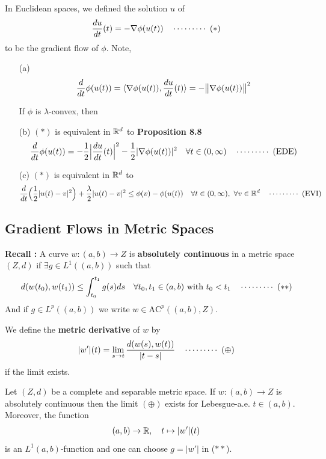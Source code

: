 \documentclass[12pt,a4paper]{article}
\begin{document}
In Euclidean spaces, we defined the solution $u$ of
\begin{align*}
\frac{du}{dt}(t) = -\nabla \phi(u(t)) \quad \cdots\cdots\cdots\,\,(*)
\end{align*}
to be the gradient flow of $\phi$. Note,
\begin{itemize}
\item[(a)]
\begin{align*}
\frac{d}{dt} \phi(u(t)) = \langle \nabla \phi(u(t)), \frac{du}{dt}(t) \rangle = -\bigl\lVert\nabla \phi(u(t))\bigr\rVert_{}^2
\end{align*}

If $\phi$ is $\lambda$-convex, then
\item[(b)] $(*)$ is equivalent in $\mathbb{R}^d$ to \textbf{Proposition 8.8}
\begin{align*}
\frac{d}{dt} \phi(u(t)) = -\frac{1}{2} \Big|\frac{du}{dt}(t)\Big|^2 - \frac{1}{2} |\nabla \phi(u(t))|^2 \quad \forall t\in (0, \infty) \quad \cdots\cdots\cdots\,\,(\text{EDE})
\end{align*}
\item[(c)] $(*)$ is equivalent in $\mathbb{R}^d$ to
\begin{align*}
\frac{d}{dt} \Big( \frac{1}{2} |u(t) - v|^2 \Big) + \frac{\lambda}{2} |u(t) - v|^2 \leq \phi(v) - \phi(u(t)) \quad \forall t\in (0, \infty), \,\, \forall v\in \mathbb{R}^d \quad \cdots\cdots\cdots\,\,(\text{EVI})
\end{align*}
\end{itemize}
\s

\subsection{Gradient Flows in Metric Spaces}

\textbf{Recall :} A curve $w: (a,b) \rightarrow Z$ is \textbf{absolutely continuous} in a metric space $(Z,d)$ if $\exists g \in L^1((a,b))$ such that
\begin{align*}
d(w(t_0), w(t_1)) \leq \int_{t_0}^{t_1} g(s) ds \quad \forall t_0, t_1 \in (a,b) \text{ with }t_0<t_1 \quad \cdots\cdots\cdots\,\,(**)
\end{align*}
And if $g\in L^p((a,b))$ we write $w\in \text{AC}^p((a,b), Z)$.
\s

 We define the \textbf{metric derivative} of $w$ by
\begin{align*}
|w'|(t) = \lim_{s\rightarrow t} \frac{d(w(s), w(t))}{|t-s|} \quad \cdots\cdots\cdots\,\,(\oplus)
\end{align*}
if the limit exists.
\s

 Let $(Z,d)$ be a complete and separable metric space. If $w: (a,b) \rightarrow Z$ is absolutely continuous then the limit $(\oplus)$ exists for Lebesgue-a.e. $t\in (a,b)$. Moreover, the function
\begin{align*}
(a,b) \rightarrow \mathbb{R}, \quad t\mapsto |w'|(t)
\end{align*}
is an $L^1(a,b)$-function and one can choose $g=|w'|$ in ($**$).
\end{document}
